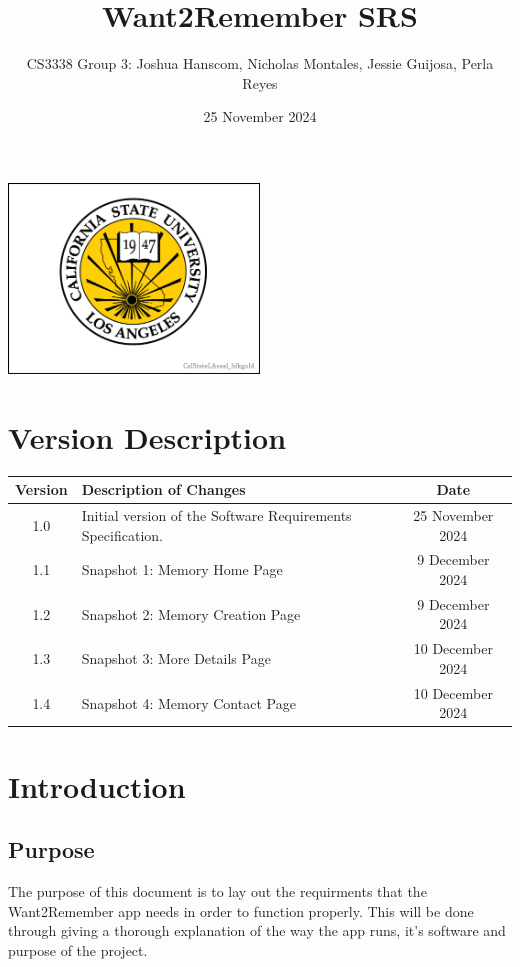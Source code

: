 \documentclass{article}
\title{Want2Remember SRS}
\author{CS3338 Group 3: Joshua Hanscom, Nicholas Montales, Jessie Guijosa, Perla Reyes}
\date{25 November 2024}
\begin{document}
\maketitle
\begin{center}
	\includegraphics[width=0.5\textwidth]{brand.png}
\end{center}
\newpage
\tableofcontents
\newpage
\section*{Version Description}
\begin{tabular}{|c|p{10cm}|c|}
\hline
\textbf{Version} & \textbf{Description of Changes} & \textbf{Date} \\ \hline
1.0 & Initial version of the Software Requirements Specification. & 25 November 2024 \\ \hline
1.1 & Snapshot 1: Memory Home Page & 9 December 2024 \\ \hline
1.2 & Snapshot 2: Memory Creation Page & 9 December 2024 \\ \hline
1.3 & Snapshot 3: More Details Page & 10 December 2024 \\ \hline
1.4 & Snapshot 4: Memory Contact Page & 10 December 2024 \\ \hline
\end{tabular}
\newpage

\section{Introduction}
\subsection{Purpose}
The purpose of this document is to lay out the requirments that the Want2Remember app needs in order to function properly. This will be done through giving a thorough explanation of the way the app runs, it's software and purpose of the project.
\end{document}
